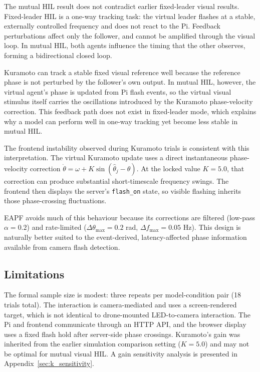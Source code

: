 \documentclass[11pt,a4paper]{article}
\begin{document}
The mutual HIL result does not contradict earlier fixed-leader visual results.
Fixed-leader HIL is a one-way tracking task: the virtual leader flashes at a
stable, externally controlled frequency and does not react to the Pi. Feedback
perturbations affect only the follower, and cannot be amplified through the
visual loop. In mutual HIL, both agents influence the timing that the other
observes, forming a bidirectional closed loop.

Kuramoto can track a stable fixed visual reference well because the reference
phase is not perturbed by the follower's own output. In mutual HIL, however,
the virtual agent's phase is updated from Pi flash events, so the virtual
visual stimulus itself carries the oscillations introduced by the Kuramoto
phase-velocity correction. This feedback path does not exist in fixed-leader
mode, which explains why a model can perform well in one-way tracking yet
become less stable in mutual HIL.

The frontend instability observed during Kuramoto trials is consistent with
this interpretation. The virtual Kuramoto update uses a direct instantaneous
phase-velocity correction $\dot\theta = \omega + K \sin(\hat\theta_j -
\theta)$. At the locked value $K=5.0$, that correction can produce substantial
short-timescale frequency swings. The frontend then displays the server's
\texttt{flash\_on} state, so visible flashing inherits those phase-crossing
fluctuations.

EAPF avoids much of this behaviour because its corrections are filtered
(low-pass $\alpha = 0.2$) and rate-limited ($\Delta\theta_{\max} = 0.2$ rad,
$\Delta f_{\max} = 0.05$ Hz). This design is naturally better suited to the
event-derived, latency-affected phase information available from camera flash
detection.

\subsection{Limitations}

The formal sample size is modest: three repeats per model-condition pair
(18 trials total). The interaction is camera-mediated and uses a
screen-rendered target, which is not identical to drone-mounted
LED-to-camera interaction. The Pi and frontend communicate through an HTTP
API, and the browser display uses a fixed flash hold after server-side phase
crossings. Kuramoto's gain was inherited from the earlier simulation
comparison setting ($K=5.0$) and may not be optimal for mutual visual HIL.
A gain sensitivity analysis is presented in
Appendix~\ref{sec:k_sensitivity}.
\end{document}
